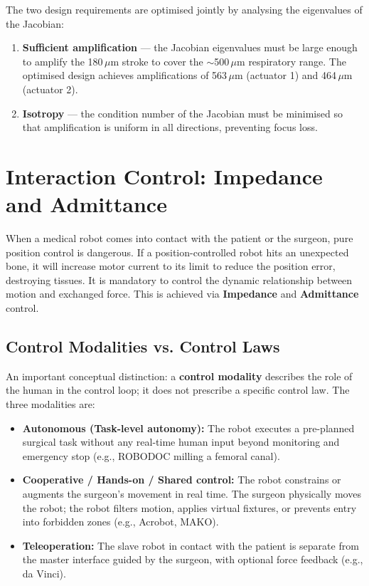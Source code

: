 \documentclass[11pt,a4paper,twoside]{report}
\begin{document}
The two design requirements are optimised jointly by analysing the eigenvalues of the Jacobian:
\begin{enumerate}
    \item \textbf{Sufficient amplification} — the Jacobian eigenvalues must be large enough to amplify the 180\,$\mu$m stroke to cover the $\sim$500\,$\mu$m respiratory range. The optimised design achieves amplifications of 563\,$\mu$m (actuator 1) and 464\,$\mu$m (actuator 2).
    \item \textbf{Isotropy} — the condition number of the Jacobian must be minimised so that amplification is uniform in all directions, preventing focus loss.
\end{enumerate}

\chapter{Interaction Control: Impedance and Admittance}

When a medical robot comes into contact with the patient or the surgeon, pure position control is dangerous. If a position-controlled robot hits an unexpected bone, it will increase motor current to its limit to reduce the position error, destroying tissues. It is mandatory to control the dynamic relationship between motion and exchanged force. This is achieved via \textbf{Impedance} and \textbf{Admittance} control.

\section{Control Modalities vs. Control Laws}
An important conceptual distinction: a \textbf{control modality} describes the role of the human in the control loop; it does not prescribe a specific control law. The three modalities are:
\begin{itemize}
    \item \textbf{Autonomous (Task-level autonomy):} The robot executes a pre-planned surgical task without any real-time human input beyond monitoring and emergency stop (e.g., ROBODOC milling a femoral canal).
    \item \textbf{Cooperative / Hands-on / Shared control:} The robot constrains or augments the surgeon's movement in real time. The surgeon physically moves the robot; the robot filters motion, applies virtual fixtures, or prevents entry into forbidden zones (e.g., Acrobot, MAKO).
    \item \textbf{Teleoperation:} The slave robot in contact with the patient is separate from the master interface guided by the surgeon, with optional force feedback (e.g., da Vinci).
\end{itemize}
\end{document}
